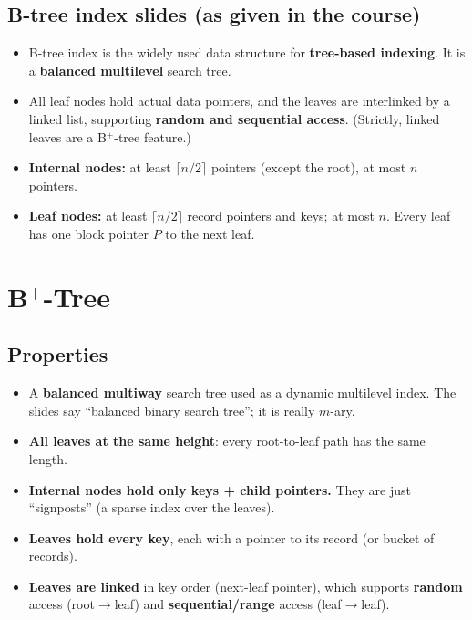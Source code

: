 \documentclass[10pt,a4paper]{article}
\begin{document}
\subsection{B-tree index slides (as given in the course)}
\begin{itemize}
  \item B-tree index is the widely used data structure for \textbf{tree-based indexing}. It is a \textbf{balanced multilevel} search tree.
  \item All leaf nodes hold actual data pointers, and the leaves are interlinked by a linked list, supporting \textbf{random and sequential access}. (Strictly, linked leaves are a B$^+$-tree feature.)
  \item \textbf{Internal nodes:} at least $\lceil n/2 \rceil$ pointers (except the root), at most $n$ pointers.
  \item \textbf{Leaf nodes:} at least $\lceil n/2 \rceil$ record pointers and keys; at most $n$. Every leaf has one block pointer $P$ to the next leaf.
\end{itemize}

\section{B$^+$-Tree}

\subsection{Properties}
\begin{itemize}
  \item A \textbf{balanced multiway} search tree used as a dynamic multilevel index. The slides say ``balanced binary search tree''; it is really $m$-ary.
  \item \textbf{All leaves at the same height}: every root-to-leaf path has the same length.
  \item \textbf{Internal nodes hold only keys + child pointers.} They are just ``signposts'' (a sparse index over the leaves).
  \item \textbf{Leaves hold every key}, each with a pointer to its record (or bucket of records).
  \item \textbf{Leaves are linked} in key order (next-leaf pointer), which supports \textbf{random} access (root$\to$leaf) and \textbf{sequential/range} access (leaf$\to$leaf).
\end{itemize}
\end{document}
